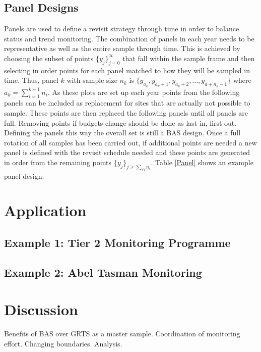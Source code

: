 \documentclass[]{article}
\begin{document}
\subsection{Panel Designs}
Panels are used to define a revisit strategy through time in order to balance status and trend monitoring. The combination of panels in each year needs to be representative as well as the entire sample through time. This is achieved by choosing the subset of points $\{y_j\}_{j = 0}^{\infty}$ that fall within the sample frame and then selecting in order points for each panel matched to how they will be sampled in time. Thus, panel $k$ with sample size $n_k$ is $\{y_{a_k}, y_{a_k+1}, y_{a_k+2},\dots,y_{a + n_k -1}\}$ where $a_k = \sum_{i=1}^{k-1} n_i$. As these plots are set up each year points from the following panels can be included as replacement for sites that are actually not possible to sample. These points are then replaced the following panels until all panels are full. Removing points if budgets change should be done as last in, first out. Defining the panels this way the overall set is still a BAS design. Once a full rotation of all samples has been carried out, if additional points are needed a new panel is defined with the revisit schedule needed and these points are generated in order from the remaining points $\{y_j\}_{j \geq \sum_{\forall i} n_i}$. Table \ref{Panel} shows an example panel design.



\section{Application}
\subsection{Example 1: Tier 2 Monitoring Programme}
\subsection{Example 2: Abel Tasman Monitoring}

\section{Discussion}
Benefits of BAS over GRTS as a master sample.
Coordination of monitoring effort.
Changing boundaries.
Analysis.



	
\end{document}
